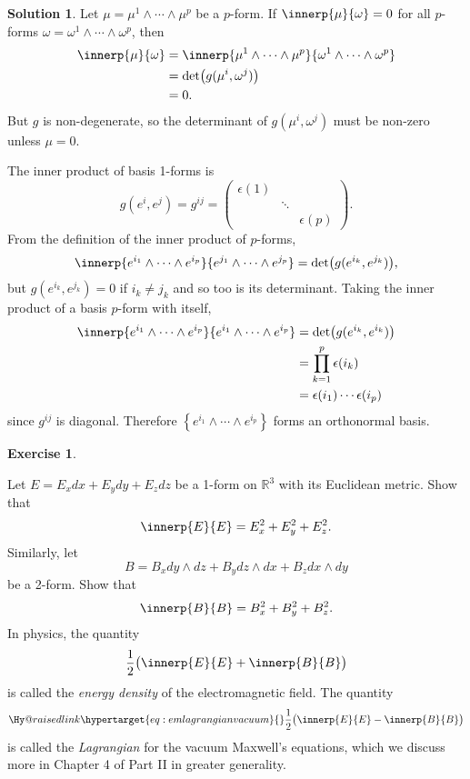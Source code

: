 \documentclass[11pt, a4paper]{report}
\makeatletter
\theoremstyle{definition}
\newtheorem{exercise}{Exercise}[part]
\newtheorem{solution}{Solution}[part]
\newenvironment{ex}{\begin{exercise}}{\end{exercise}\pagebreak[1]}
\newenvironment{sol}{\begin{solution}}{\end{solution}\pagebreak[3]}
\newcommand*{\labeltarget}[1]{\Hy@raisedlink{\hypertarget{#1}{}}}
\makeatother
\begin{document}
\begin{sol}

Let $\mu = \mu^1 \wedge \cdots \wedge \mu^p$ be a $p$-form. If $\innerp{\mu}{ \omega} = 0$ for all $p$-forms $\omega = \omega^1 \wedge \cdots \wedge \omega^p$, then
\begin{align*}
    \innerp{\mu}{\omega} &= \innerp{\mu^1 \wedge \cdots \wedge \mu^p}
                                   {\omega^1 \wedge \cdots \wedge \omega^p} \\
        &= \det \bigl( g(\mu^i, \omega^j) \bigr) \\
        &= 0.
\end{align*}
But $g$ is non-degenerate, so the determinant of $g(\mu^i, \omega^j)$ must be non-zero unless $\mu = 0$.

The inner product of basis 1-forms is
\[
    g(e^i, e^j) = g^{ij} = \begin{pmatrix}
            \epsilon(1) & & \\
            & \ddots & \\
            & & \epsilon(p)
        \end{pmatrix}.
\]
From the definition of the inner product of $p$-forms,
\[
    \innerp{e^{i_1} \wedge \cdots \wedge e^{i_p}}
           {e^{j_1} \wedge \cdots \wedge e^{j_p}}
        = \det \bigl( g(e^{i_k}, e^{j_k}) \bigr),
\]
but $g(e^{i_k}, e^{j_k}) = 0$ if $i_k \neq j_k$ and so too is its determinant.
Taking the inner product of a basis $p$-form with itself,
\begin{align*}
    \innerp{e^{i_1} \wedge \cdots \wedge e^{i_p}}
           {e^{i_1} \wedge \cdots \wedge e^{i_p}}
        &= \det \bigl( g(e^{i_k}, e^{i_k}) \bigr) \\
        &= \prod_{k = 1}^p \epsilon(i_k) \\
        &= \epsilon(i_1) \cdots \epsilon(i_p)
\end{align*}
since $g^{ij}$ is diagonal. Therefore $\left\{e^{i_1} \wedge \cdots \wedge e^{i_p}\right\}$ forms an orthonormal basis.

\end{sol}

\begin{ex}\label{ex:esquaredbsquared}

Let $E = E_x dx + E_y dy + E_z dz$ be a 1-form on $\mathbb{R}^3$ with its Euclidean metric. Show that
\[
    \innerp{E}{E} = E_x^2 + E_y^2 + E_z^2.
\]
Similarly, let
\[
    B = B_x dy \wedge dz + B_y dz \wedge dx + B_z dx \wedge dy
\]
be a 2-form. Show that
\[
    \innerp{B}{B} = B_x^2 + B_y^2 + B_z^2.
\]
In physics, the quantity
\[
    \frac{1}{2} \bigl( \innerp{E}{E} + \innerp{B}{B} \bigr)
\]
is called the \emph{energy density} of the electromagnetic field. The quantity
\begin{equation*}
    \labeltarget{eq:emlagrangianvacuum}
    \frac{1}{2} \bigl( \innerp{E}{E} - \innerp{B}{B} \bigr)
\end{equation*}
is called the \emph{Lagrangian} for the vacuum Maxwell's equations, which we discuss more in Chapter 4 of Part II in greater generality.

\end{ex}
\end{document}
